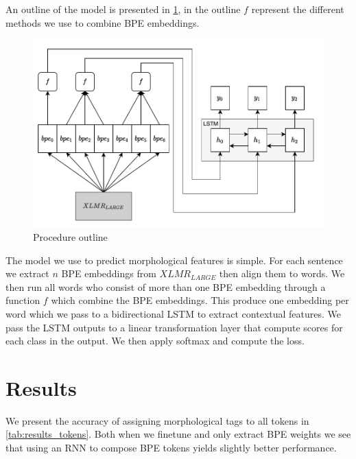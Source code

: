 \documentclass[11pt]{article}
\begin{document}
	
	An outline of the model is presented in \cref{fig:model}, in the outline $f$ represent the different methods we use to combine BPE embeddings.
	
	\begin{figure}[h!]
		\centering
		\includegraphics[scale=0.2]{model_outline-5.pdf}
		\caption{\label{fig:model} Procedure outline}
	\end{figure}
	
	The model we use to predict morphological features is simple. For each sentence we extract $n$ BPE embeddings from $XLMR_{LARGE}$ then align them to words. 
	We then run all words who consist of more than one BPE embedding through a function $f$ which combine the BPE embeddings. This produce one embedding per word which we pass to a bidirectional LSTM to extract contextual features. 
	We pass the LSTM outputs to a linear transformation layer that compute scores for each class in the output. We then apply softmax and compute the loss.

	
	\section{Results}
	\label{results}
	
	
	
	We present the accuracy of assigning morphological tags to all tokens in \cref{tab:results_tokens}. Both when we finetune and only extract BPE weights we see that using an RNN to compose BPE tokens yields slightly better performance.
	
	
\end{document}
